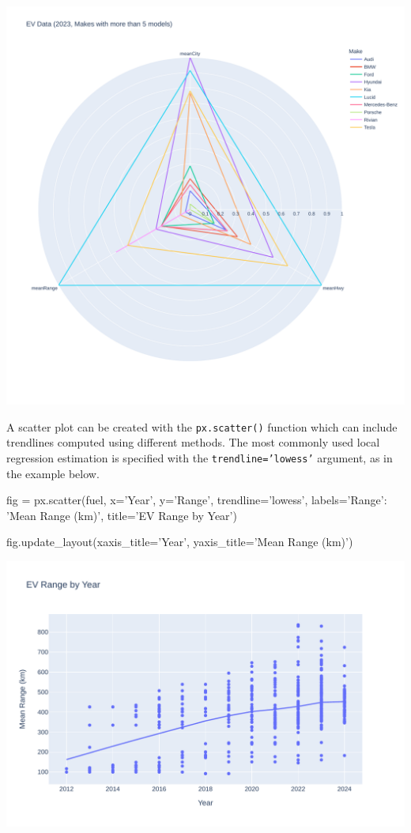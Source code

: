 \begin{center}
  \includegraphics[width=.8\textwidth]{px.fuel.radar.pdf}
\end{center}

A scatter plot can be created with the \texttt{px.scatter()} function which can include trendlines computed using different methods. The most commonly used local regression estimation is specified with the \texttt{trendline='lowess'} argument, as in the example below.

\begin{samepage}
\begin{pythoncode}
fig = px.scatter(fuel, 
    x='Year', y='Range', trendline='lowess',
    labels={'Range': 'Mean Range (km)'},
    title='EV Range by Year')

fig.update_layout(xaxis_title='Year',
                  yaxis_title='Mean Range (km)')
\end{pythoncode}
\end{samepage}

\begin{center}
  \includegraphics[width=\textwidth]{px.fuel.linesSmooth.pdf}
\end{center}

